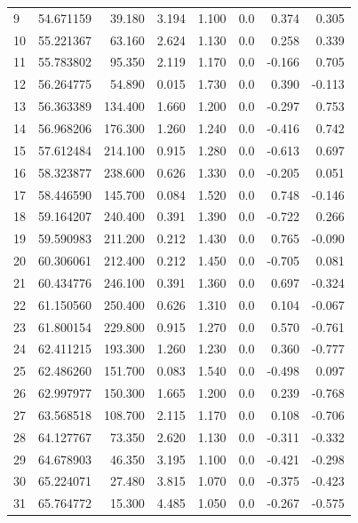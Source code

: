 \begin{longtable}{lrrrrrrr}
9 & 54.671159 &  39.180 &  3.194 &    1.100 & 0.0 &   0.374 &    0.305\\
10 & 55.221367 &  63.160 &  2.624 &    1.130 & 0.0 &   0.258 &    0.339\\
11 & 55.783802 &  95.350 &  2.119 &    1.170 & 0.0 &  -0.166 &    0.705\\
12 & 56.264775 &  54.890 &  0.015 &    1.730 & 0.0 &   0.390 &   -0.113\\
13 & 56.363389 & 134.400 &  1.660 &    1.200 & 0.0 &  -0.297 &    0.753\\
14 & 56.968206 & 176.300 &  1.260 &    1.240 & 0.0 &  -0.416 &    0.742\\
15 & 57.612484 & 214.100 &  0.915 &    1.280 & 0.0 &  -0.613 &    0.697\\
16 & 58.323877 & 238.600 &  0.626 &    1.330 & 0.0 &  -0.205 &    0.051\\
17 & 58.446590 & 145.700 &  0.084 &    1.520 & 0.0 &   0.748 &   -0.146\\
18 & 59.164207 & 240.400 &  0.391 &    1.390 & 0.0 &  -0.722 &    0.266\\
19 & 59.590983 & 211.200 &  0.212 &    1.430 & 0.0 &   0.765 &   -0.090\\
20 & 60.306061 & 212.400 &  0.212 &    1.450 & 0.0 &  -0.705 &    0.081\\
21 & 60.434776 & 246.100 &  0.391 &    1.360 & 0.0 &   0.697 &   -0.324\\
22 & 61.150560 & 250.400 &  0.626 &    1.310 & 0.0 &   0.104 &   -0.067\\
23 & 61.800154 & 229.800 &  0.915 &    1.270 & 0.0 &   0.570 &   -0.761\\
24 & 62.411215 & 193.300 &  1.260 &    1.230 & 0.0 &   0.360 &   -0.777\\
25 & 62.486260 & 151.700 &  0.083 &    1.540 & 0.0 &  -0.498 &    0.097\\
26 & 62.997977 & 150.300 &  1.665 &    1.200 & 0.0 &   0.239 &   -0.768\\
27 & 63.568518 & 108.700 &  2.115 &    1.170 & 0.0 &   0.108 &   -0.706\\
28 & 64.127767 &  73.350 &  2.620 &    1.130 & 0.0 &  -0.311 &   -0.332\\
29 & 64.678903 &  46.350 &  3.195 &    1.100 & 0.0 &  -0.421 &   -0.298\\
30 & 65.224071 &  27.480 &  3.815 &    1.070 & 0.0 &  -0.375 &   -0.423\\
31 & 65.764772 &  15.300 &  4.485 &    1.050 & 0.0 &  -0.267 &   -0.575\\

\end{longtable}
